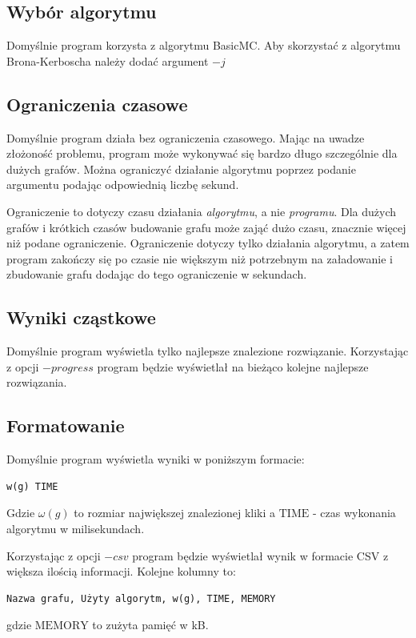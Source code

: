 \documentclass[12pt, a4paper]{article}
\begin{document}
\subsection{Wybór algorytmu}
Domyślnie program korzysta z algorytmu BasicMC. Aby skorzystać z algorytmu Brona-Kerboscha należy dodać argument $-j$

\subsection{Ograniczenia czasowe}
Domyślnie program działa bez ograniczenia czasowego. Mając na uwadze złożoność problemu, program może wykonywać się bardzo długo szczególnie dla dużych grafów. Można ograniczyć działanie algorytmu poprzez podanie argumentu \emph{} podając odpowiednią liczbę sekund.

Ograniczenie to dotyczy czasu działania \emph{algorytmu}, a nie \emph{programu}. Dla dużych grafów i krótkich czasów budowanie grafu może zająć dużo czasu, znacznie więcej niż podane ograniczenie. Ograniczenie dotyczy tylko działania algorytmu, a zatem program zakończy się po czasie nie większym niż potrzebnym na załadowanie i zbudowanie grafu dodając do tego ograniczenie w sekundach.

\subsection{Wyniki cząstkowe}
Domyślnie program wyświetla tylko najlepsze znalezione rozwiązanie. Korzystając z opcji $-progress$ program będzie wyświetlał na bieżąco kolejne najlepsze rozwiązania.

\subsection{Formatowanie}
Domyślnie program wyświetla wyniki w poniższym formacie:

\begin{verbatim}
w(g) TIME
\end{verbatim}
Gdzie $\omega(g)$ to rozmiar największej znalezionej kliki a $\text{TIME}$ - czas wykonania algorytmu w milisekundach.

Korzystając z opcji $-csv$ program będzie wyświetlał wynik w formacie CSV z większa ilością informacji. Kolejne kolumny to:
\begin{verbatim}
Nazwa grafu, Użyty algorytm, w(g), TIME, MEMORY
\end{verbatim}

gdzie $\text{MEMORY}$ to zużyta pamięć w kB.
\end{document}
